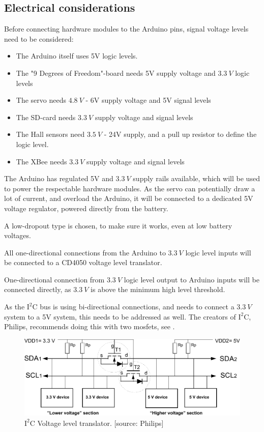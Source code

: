 \subsection{Electrical considerations}

Before connecting hardware modules to the Arduino pins, signal voltage levels need to be considered:

\begin{itemize}
\item The Arduino itself uses 5V logic levels.
\item The "9 Degrees of Freedom"-board needs 5V supply voltage and $\SI{3,3}{V}$ logic levels
\item The servo needs $\SI{4,8}{V}$ - 6V supply voltage and 5V signal levels
\item The SD-card needs $\SI{3,3}{V}$ supply voltage and signal levels
\item The Hall sensors need $\SI{3,5}{V}$ - 24V supply, and a pull up resistor to define the logic level.
\item The XBee needs $\SI{3,3}{V}$ supply voltage and signal levels
\end{itemize} 

The Arduino has regulated 5V and $\SI{3,3}{V}$ supply rails available, which will be used to power the respectable hardware modules. As the servo can potentially draw a lot of current, and overload the Arduino, it will be connected to a dedicated 5V voltage regulator, powered directly from the battery.

A low-dropout type is chosen, to make sure it works, even at low battery voltages. 

All one-directional connections from the Arduino to  $\SI{3,3}{V}$ logic level inputs will be connected to a CD4050 voltage level translator. 

One-directional connection from  $\SI{3,3}{V}$ logic level output to Arduino inputs will be connected directly, as $\SI{3,3}{V}$ is above the minimum high level threshold. 

As the $\text{I}^2\text{C}$ bus is using bi-directional connections, and needs to connect a $\SI{3,3}{V}$ system to a 5V system, this needs to be addressed as well. The creators of $\text{I}^2\text{C}$, Philips, recommends doing this with two mosfets, see .

\begin{figure}[H]
	\centering
	\includegraphics[scale=0.9]{figures/i2cLevel.pdf}
	\caption{$\text{I}^2\text{C}$ Voltage level translator. [source: Philips]}
	\label{i2clevel}
\end{figure}

